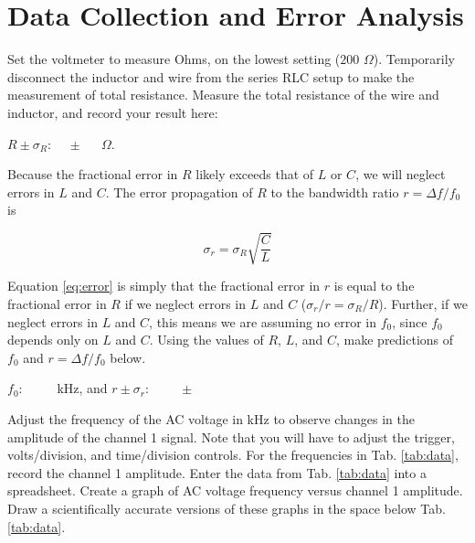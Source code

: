 \documentclass[12pt,twocolumn]{article}
\begin{document}
\section{Data Collection and Error Analysis}

Set the voltmeter to measure Ohms, on the lowest setting ($200$ $\Omega$).  Temporarily disconnect the inductor and wire from the series RLC setup to make the measurement of total resistance.  Measure the total resistance of the wire and inductor, and record your result here: \\ \vspace{0.5cm}

\underline{$R\pm \sigma_R: ~~~~~ \pm ~~~~~$} $\Omega$. \\ \vspace{0.5cm}

Because the fractional error in $R$ likely exceeds that of $L$ or $C$, we will neglect errors in $L$ and $C$.  The error propagation of $R$ to the bandwidth ratio $r = \Delta f/f_0$ is

\begin{equation}
\sigma_r = \sigma_R \sqrt{\frac{C}{L}} \label{eq:error}
\end{equation}

Equation \ref{eq:error} is simply that the fractional error in $r$ is equal to the fractional error in $R$ if we neglect errors in $L$ and $C$ ($\sigma_r/r = \sigma_R/R$).  Further, if we neglect errors in $L$ and $C$, this means we are assuming no error in $f_0$, since $f_0$ depends only on $L$ and $C$.  Using the values of $R$, $L$, and $C$, make predictions of $f_0$ and $r = \Delta f/f_0$ below. \\ \vspace{0.5cm}

\underline{$f_0: ~~~~~~~~~~$} kHz, and \underline{$r \pm \sigma_r: ~~~~~~~~~~\pm~~~~~~~~~~$} \\ \vspace{0.5cm}

Adjust the frequency of the AC voltage in kHz to observe changes in the amplitude of the channel 1 signal.  Note that you will have to adjust the trigger, volts/division, and time/division controls.  For the frequencies in Tab. \ref{tab:data}, record the channel 1 amplitude.  Enter the data from Tab. \ref{tab:data} into a spreadsheet.  Create a graph of AC voltage frequency versus channel 1 amplitude.  Draw a scientifically accurate versions of these graphs in the space below Tab. \ref{tab:data}. \\ \\ \\
\end{document}
